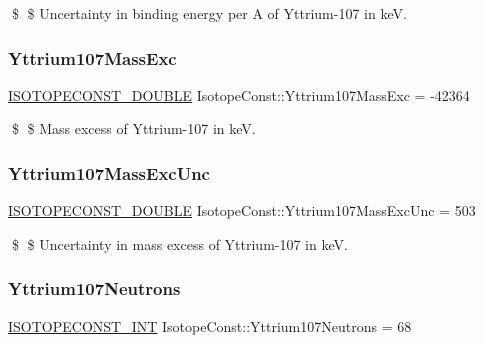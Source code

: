 \$ \$ Uncertainty in binding energy per A of Yttrium-\/107 in keV. \mbox{\label{group___isotope_const-_yttrium-_y107_ga47d23126f216f3fedcbe34369130e5c6}} 
\subsubsection{\texorpdfstring{Yttrium107\+Mass\+Exc}{Yttrium107MassExc}}
{\footnotesize\ttfamily \mbox{\hyperlink{group___isotope_const-_macros_ga8f45a7272ce02c0b4c65c44636ed719a}{I\+S\+O\+T\+O\+P\+E\+C\+O\+N\+S\+T\+\_\+\+D\+O\+U\+B\+LE}} Isotope\+Const\+::\+Yttrium107\+Mass\+Exc = -\/42364}

\$ \$ Mass excess of Yttrium-\/107 in keV. \mbox{\label{group___isotope_const-_yttrium-_y107_ga2d7bd453333f4eda33a3d736b8c5a3de}} 
\subsubsection{\texorpdfstring{Yttrium107\+Mass\+Exc\+Unc}{Yttrium107MassExcUnc}}
{\footnotesize\ttfamily \mbox{\hyperlink{group___isotope_const-_macros_ga8f45a7272ce02c0b4c65c44636ed719a}{I\+S\+O\+T\+O\+P\+E\+C\+O\+N\+S\+T\+\_\+\+D\+O\+U\+B\+LE}} Isotope\+Const\+::\+Yttrium107\+Mass\+Exc\+Unc = 503}

\$ \$ Uncertainty in mass excess of Yttrium-\/107 in keV. \mbox{\label{group___isotope_const-_yttrium-_y107_ga3327d6d236281c4fe80064dc44337da6}} 
\subsubsection{\texorpdfstring{Yttrium107\+Neutrons}{Yttrium107Neutrons}}
{\footnotesize\ttfamily \mbox{\hyperlink{group___isotope_const-_macros_ga5f18360b3e99483a35c32d789e62621c}{I\+S\+O\+T\+O\+P\+E\+C\+O\+N\+S\+T\+\_\+\+I\+NT}} Isotope\+Const\+::\+Yttrium107\+Neutrons = 68}

